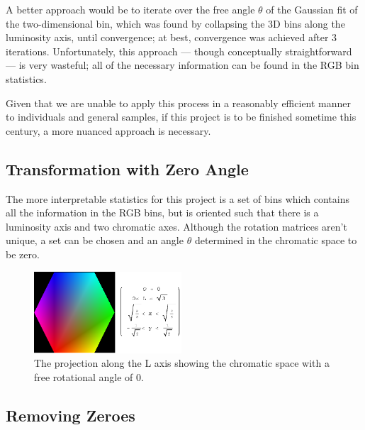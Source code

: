 A better approach would be to iterate over the free angle $\theta$ of the Gaussian fit of the two-dimensional bin, which was found by collapsing the 3D bins along the luminosity axis, until convergence; at best, convergence was achieved after 3 iterations. Unfortunately, this approach --- though conceptually straightforward --- is very wasteful; all of the necessary information can be found in the RGB bin statistics.

Given that we are unable to apply this process in a reasonably efficient manner to individuals and general samples, if this project is to be finished sometime this century, a more nuanced approach is necessary.

\subsection{Transformation with Zero Angle}\label{sec:TransWithZeroAngle}

The more interpretable statistics for this project is a set of bins which contains all the information in the RGB bins, but is oriented such that there is a luminosity axis and two chromatic axes. Although the rotation matrices aren't unique, a set can be chosen and an angle $\theta$ determined in the chromatic space to be zero.

\begin{figure}[h!]
  \centering
    \includegraphics[width=0.49\textwidth]{Chapter2/Figs/xy_Polygon.eps}
    \caption{The projection along the L axis showing the chromatic space with a free rotational angle of 0.}  \label{fig:xyPolygon}
\end{figure}



\subsection{Removing Zeroes}\label{sec:RemovingZeroes}

